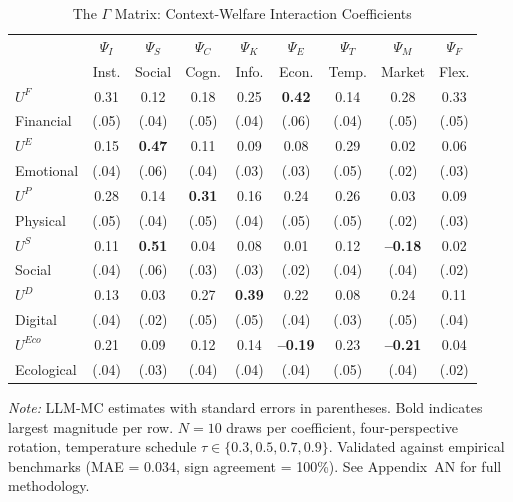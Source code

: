 \begin{table}[htbp]
\centering
\caption{The $\Gamma$ Matrix: Context-Welfare Interaction Coefficients}
\label{tab:gamma-matrix}
\small
\begin{tabular}{@{}lcccccccc@{}}
\toprule
& $\Psi_I$ & $\Psi_S$ & $\Psi_C$ & $\Psi_K$ & $\Psi_E$ & $\Psi_T$ & $\Psi_M$ & $\Psi_F$ \\
& \tiny{Inst.} & \tiny{Social} & \tiny{Cogn.} & \tiny{Info.} & \tiny{Econ.} & \tiny{Temp.} & \tiny{Market} & \tiny{Flex.} \\
\midrule
$U^F$ & 0.31 & 0.12 & 0.18 & 0.25 & \textbf{0.42} & 0.14 & 0.28 & 0.33 \\
\tiny{Financial} & \tiny{(.05)} & \tiny{(.04)} & \tiny{(.05)} & \tiny{(.04)} & \tiny{(.06)} & \tiny{(.04)} & \tiny{(.05)} & \tiny{(.05)} \\
\addlinespace
$U^E$ & 0.15 & \textbf{0.47} & 0.11 & 0.09 & 0.08 & 0.29 & 0.02 & 0.06 \\
\tiny{Emotional} & \tiny{(.04)} & \tiny{(.06)} & \tiny{(.04)} & \tiny{(.03)} & \tiny{(.03)} & \tiny{(.05)} & \tiny{(.02)} & \tiny{(.03)} \\
\addlinespace
$U^P$ & 0.28 & 0.14 & \textbf{0.31} & 0.16 & 0.24 & 0.26 & 0.03 & 0.09 \\
\tiny{Physical} & \tiny{(.05)} & \tiny{(.04)} & \tiny{(.05)} & \tiny{(.04)} & \tiny{(.05)} & \tiny{(.05)} & \tiny{(.02)} & \tiny{(.03)} \\
\addlinespace
$U^S$ & 0.11 & \textbf{0.51} & 0.04 & 0.08 & 0.01 & 0.12 & \textbf{--0.18} & 0.02 \\
\tiny{Social} & \tiny{(.04)} & \tiny{(.06)} & \tiny{(.03)} & \tiny{(.03)} & \tiny{(.02)} & \tiny{(.04)} & \tiny{(.04)} & \tiny{(.02)} \\
\addlinespace
$U^D$ & 0.13 & 0.03 & 0.27 & \textbf{0.39} & 0.22 & 0.08 & 0.24 & 0.11 \\
\tiny{Digital} & \tiny{(.04)} & \tiny{(.02)} & \tiny{(.05)} & \tiny{(.05)} & \tiny{(.04)} & \tiny{(.03)} & \tiny{(.05)} & \tiny{(.04)} \\
\addlinespace
$U^{Eco}$ & 0.21 & 0.09 & 0.12 & 0.14 & \textbf{--0.19} & 0.23 & \textbf{--0.21} & 0.04 \\
\tiny{Ecological} & \tiny{(.04)} & \tiny{(.03)} & \tiny{(.04)} & \tiny{(.04)} & \tiny{(.04)} & \tiny{(.05)} & \tiny{(.04)} & \tiny{(.02)} \\
\bottomrule
\end{tabular}
\begin{flushleft}
\small\textit{Note:} LLM-MC estimates with standard errors in parentheses. Bold indicates largest magnitude per row. $N=10$ draws per coefficient, four-perspective rotation, temperature schedule $\tau \in \{0.3, 0.5, 0.7, 0.9\}$. Validated against empirical benchmarks (MAE = 0.034, sign agreement = 100\%). See Appendix~AN for full methodology.
\end{flushleft}
\end{table}

